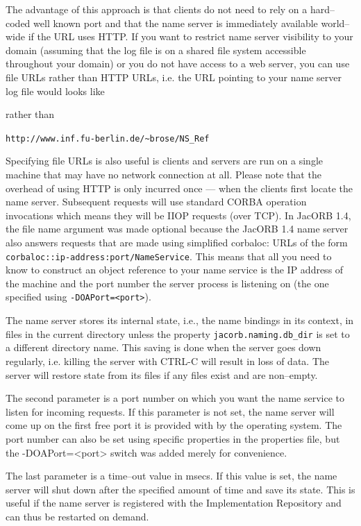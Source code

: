 The advantage of this approach is  that clients do not need to rely on
a hard--coded well known port  and that the name server is immediately
available world--wide  if the URL uses  HTTP. If you  want to restrict
name server visibility  to your domain (assuming that  the log file is
on a shared  file system accessible throughout your  domain) or you do
not have  access to a  web server, you  can use file URLs  rather than
HTTP URLs,  i.e. the URL pointing  to your name server  log file would
looks like


rather than

\noindent\verb+http://www.inf.fu-berlin.de/~brose/NS_Ref+

Specifying file URLs is also useful is clients and servers are run on
a single machine that may have no network connection at all. Please
note that the overhead of using HTTP is only incurred once --- when
the clients first locate the name server.  Subsequent requests will
use standard CORBA operation invocations which means they will be IIOP
requests (over TCP). In JacORB 1.4, the file name argument was made
optional because the JacORB 1.4 name server also answers requests that
are made using simplified corbaloc: URLs of the form {\tt
  corbaloc::ip-address:port/NameService}. This means that all you need
to know to construct an object reference to your name service is the
IP address of the machine and the port number  the server process is
listening on (the one specified using {\tt -DOAPort=<port>}).

The name server stores its  internal state, i.e., the name bindings in
its context,  in files  in the current  directory unless  the property
{\tt jacorb.naming.db\_dir} is set to a different directory name. This
saving is done  when the server goes down  regularly, i.e. killing the
server  with CTRL-C  will result  in loss  of data.   The  server will
restore state from its files if any files exist and are non--empty.

The second  parameter is a port number on which you want the name
service to listen for incoming requests. If this parameter is not
set, the name server will come up on the first free port it is
provided with by the operating system. The port number can also be set
using specific properties in the properties file, but the -DOAPort=<port> switch
was added merely for convenience.

The last  parameter is a time--out  value in msecs. If  this value is
set, the name server will shut down after the specified amount of time
and save  its state. This is  useful if the name  server is registered
with  the  Implementation Repository  and  can  thus  be restarted  on
demand.

